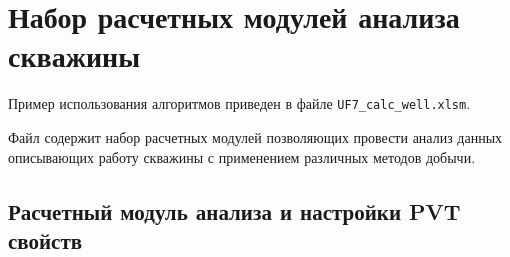 \section{Набор расчетных модулей анализа скважины}
Пример использования алгоритмов \unf   приведен в файле \texttt{UF7\_calc\_well.xlsm}.

Файл содержит набор расчетных модулей позволяющих провести анализ данных описывающих работу скважины с применением различных методов добычи.

\subsection{Расчетный модуль анализа и настройки PVT свойств}


